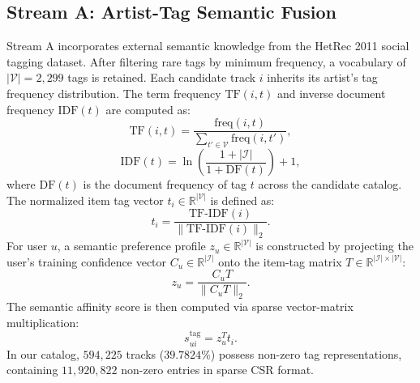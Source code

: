 \documentclass[conference]{IEEEtran}
\begin{document}
\subsection{Stream A: Artist-Tag Semantic Fusion}
Stream A incorporates external semantic knowledge from the HetRec 2011 social tagging dataset. After filtering rare tags by minimum frequency, a vocabulary of $|\mathcal{V}| = 2,299$ tags is retained. Each candidate track $i$ inherits its artist's tag frequency distribution. The term frequency $\text{TF}(i, t)$ and inverse document frequency $\text{IDF}(t)$ are computed as:
\begin{equation}
\text{TF}(i, t) = \frac{\text{freq}(i, t)}{\sum_{t' \in \mathcal{V}} \text{freq}(i, t')},
\end{equation}
\begin{equation}
\text{IDF}(t) = \ln \left( \frac{1 + |\mathcal{I}|}{1 + \text{DF}(t)} \right) + 1,
\end{equation}
where $\text{DF}(t)$ is the document frequency of tag $t$ across the candidate catalog. The normalized item tag vector $t_i \in \mathbb{R}^{|\mathcal{V}|}$ is defined as:
\begin{equation}
t_i = \frac{\text{TF-IDF}(i)}{\|\text{TF-IDF}(i)\|_2}.
\end{equation}
For user $u$, a semantic preference profile $z_u \in \mathbb{R}^{|\mathcal{V}|}$ is constructed by projecting the user's training confidence vector $C_u \in \mathbb{R}^{|\mathcal{I}|}$ onto the item-tag matrix $T \in \mathbb{R}^{|\mathcal{I}| \times |\mathcal{V}|}$:
\begin{equation}
z_u = \frac{C_u T}{\|C_u T\|_2}.
\end{equation}
The semantic affinity score is then computed via sparse vector-matrix multiplication:
\begin{equation}
s_{ui}^{\text{tag}} = z_u^T t_i.
\end{equation}
In our catalog, $594,225$ tracks ($39.7824\%$) possess non-zero tag representations, containing $11,920,822$ non-zero entries in sparse CSR format.
\end{document}
